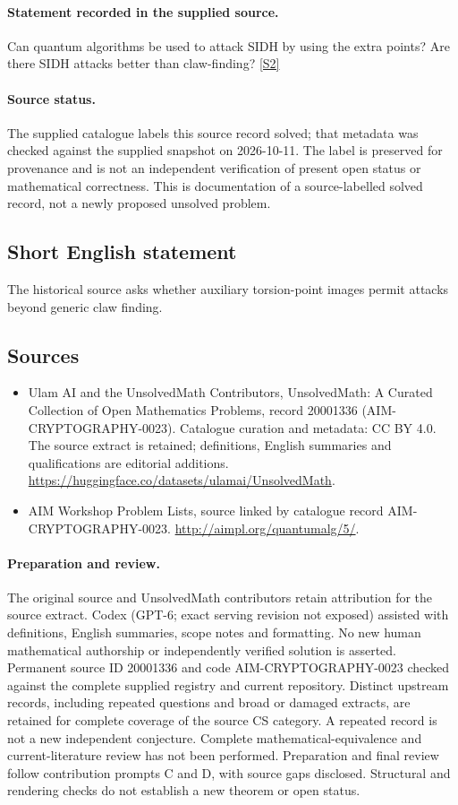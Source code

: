 \documentclass[11pt]{article}
\begin{document}
\paragraph{Statement recorded in the supplied source.}
Can quantum algorithms be used to attack SIDH by using the extra points? Are there SIDH attacks better than claw-finding? \href{http://aimpl.org/quantumalg/5/}{[S2]}
\paragraph{Source status.}
The supplied catalogue labels this source record solved; that metadata was checked against the supplied snapshot on 2026-10-11. The label is preserved for provenance and is not an independent verification of present open status or mathematical correctness. This is documentation of a source-labelled solved record, not a newly proposed unsolved problem.
\subsection{Short English statement}
The historical source asks whether auxiliary torsion-point images permit attacks beyond generic claw finding.
\subsection{Sources}
\begin{itemize}
\item[S1] Ulam AI and the UnsolvedMath Contributors, UnsolvedMath: A Curated Collection of Open Mathematics Problems, record 20001336 (AIM-CRYPTOGRAPHY-0023). Catalogue curation and metadata: CC BY 4.0. The source extract is retained; definitions, English summaries and qualifications are editorial additions.
\url{https://huggingface.co/datasets/ulamai/UnsolvedMath}.
\item[S2] AIM Workshop Problem Lists, source linked by catalogue record AIM-CRYPTOGRAPHY-0023.
\url{http://aimpl.org/quantumalg/5/}.
\end{itemize}
\paragraph{Preparation and review.}
The original source and UnsolvedMath contributors retain attribution for the source extract. Codex (GPT-6; exact serving revision not exposed) assisted with definitions, English summaries, scope notes and formatting. No new human mathematical authorship or independently verified solution is asserted. Permanent source ID 20001336 and code AIM-CRYPTOGRAPHY-0023 checked against the complete supplied registry and current repository. Distinct upstream records, including repeated questions and broad or damaged extracts, are retained for complete coverage of the source CS category. A repeated record is not a new independent conjecture. Complete mathematical-equivalence and current-literature review has not been performed. Preparation and final review follow contribution prompts C and D, with source gaps disclosed. Structural and rendering checks do not establish a new theorem or open status.
\label{end:20001336}
\end{document}
